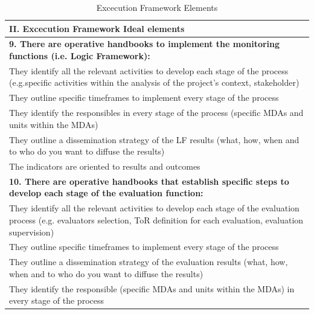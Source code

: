 \documentclass[
  10pt,
]{book}
\begin{document}
\begin{table}

\caption{\label{tab:unnamed-chunk-2}Excecution Framework Elements}
\centering
\begin{tabular}[t]{l}
\hline
II. Excecution Framework Ideal elements\\
\hline
\multicolumn{1}{l}{\textbf{9. There are operative handbooks to implement the monitoring functions (i.e. Logic Framework):}}\\
\hline
\hspace{1em}They identify all the relevant activities to develop each stage of the process (e.g.specific activities within the analysis of the project's context, stakeholder)\\
\hline
\hspace{1em}They outline specific timeframes to implement every stage of the \vphantom{1} process\\
\hline
\hspace{1em}They identify the responsibles in every stage of the process (specific MDAs and units within the MDAs)\\
\hline
\hspace{1em}They outline a dissemination strategy of the LF results (what, how, when and to who do you want to diffuse the results)\\
\hline
\hspace{1em}The indicators are oriented to results and outcomes\\
\hline
\multicolumn{1}{l}{\textbf{10. There are operative handbooks that establish specific steps to develop each stage of the evaluation function:}}\\
\hline
\hspace{1em}They identify all the relevant activities to develop each stage of the evaluation process (e.g. evaluators selection, ToR definition for each evaluation, evaluation supervision)\\
\hline
\hspace{1em}They outline specific timeframes to implement every stage of the process\\
\hline
\hspace{1em}They outline a dissemination strategy of the evaluation results (what, how, when and to who do you want to diffuse the results)\\
\hline
\hspace{1em}They identify the responsible (specific MDAs and units within the MDAs)  in every stage of the process\\

\end{tabular}
\end{table}
\end{document}

